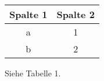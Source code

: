 \begin{center}
\begin{tabular}{|c|c|}
	\hline
	Spalte 1 & Spalte 2 \\
	\hline
	a & 1 \\
	\hline
	b & 2 \\
	\hline
\end{tabular}
\end{center}

Siehe Tabelle 1.